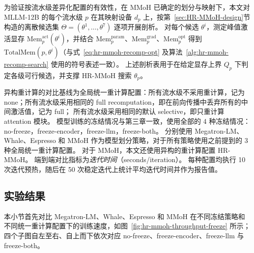 为验证按流水级差异化配置的有效性，在 MMoH 已确定的划分与映射下，本文对 MLLM-12B 的每个流水级 $p$ 在其映射设备 $d_p$ 上，按第~\ref{sec:HR-MMoH-design}节构造的离散候选集 $\Theta=(\theta^{1},\ldots,\theta^{7})$ 逐项开展剖析。
对每个候选 $\theta^{i}$，测定峰值激活显存 $\mathrm{Mem}_p^{\mathrm{act}}(\theta^{i})$，并结合 $\mathrm{Mem}_p^{\mathrm{param}}$、$\mathrm{Mem}_p^{\mathrm{grad}}$、$\mathrm{Mem}_p^{\mathrm{opt}}$ 得到 $\mathrm{TotalMem}(p,\theta^{i})$（与式~\eqref{eq:hr-mmoh-recomp-opt} 及算法~\ref{alg:hr-mmoh-recomp-search} 使用的符号表述一致）。
上述剖析表用于在给定显存上界 $Q_p$ 下判定各级可行候选，并支撑 HR-MMoH 搜索 $\theta_p$。

异构重计算的对比基线为全局统一重计算配置：所有流水级不采用重计算，记为 none；所有流水级采用相同的 full recomputation，即在前向传播中丢弃所有的中间激活值，记为 full；
所有流水级采用相同的默认 selective，即只重计算 attention 模块。
模型训练的冻结情况与第三章一致，使用全部的 4 种冻结情况：no-freeze，freeze-encoder，freeze-llm，freeze-both。
分别使用 Megatron-LM、Whale、Espresso 和 MMoH 作为模型划分策略，对于所有策略使用之前提到的 3 种全局统一重计算配置。
对于 MMoH，本文还使用异构的重计算配置 HR-MMoH。
端到端对比指标为\emph{迭代时间}（seconds/iteration）。
每种配置均执行 10 次迭代预热，随后在 50 次稳定迭代上统计平均迭代时间并作为报告值。

\subsection{实验结果}

本小节首先对比 Megatron-LM、Whale、Espresso 和 MMoH 在不同冻结策略和不同统一重计算配置下的训练速度，如图~\ref{fig:hr-mmoh-throughput-freeze} 所示；四个子图自左至右、自上而下依次对应 no-freeze、freeze-encoder、freeze-llm 与 freeze-both。

